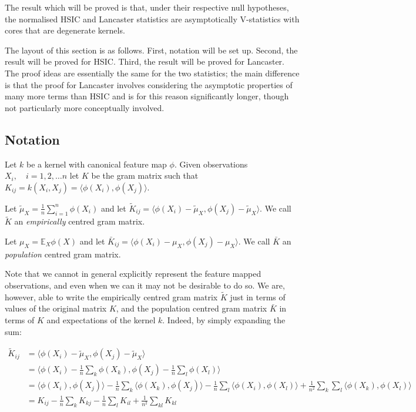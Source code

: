 \documentclass[12pt]{article}
\numberwithin{claim}{section}
\numberwithin{lemma}{section}
\numberwithin{theorem}{section}
\begin{document}
The result which will be proved is that, under their respective null hypotheses, the normalised HSIC and Lancaster statistics are asymptotically V-statistics with cores that are degenerate kernels. 

The layout of this section is as follows. First, notation will be set up. Second, the result will be proved for HSIC. Third, the result will be proved for Lancaster. The proof ideas are essentially the same for the two statistics; the main difference is that the proof for Lancaster involves considering the asymptotic properties of many more terms than HSIC and is for this reason significantly longer, though not particularly more conceptually involved.

\subsection{Notation}

Let $k$ be a kernel with canonical feature map $\phi$. Given observations $X_i, \quad i=1,2,\ldots n$ let $K$ be the gram matrix such that $K_{ij} = k(X_i,X_j) =  \langle \phi(X_i),\phi(X_j) \rangle$.

Let $\tilde{\mu}_X = \frac{1}{n}\sum_{i=1}^{n} \phi(X_i)$ and let $\tilde{K}_{ij} = \langle \phi(X_i) - \tilde{\mu}_X, \phi(X_j) - \tilde{\mu}_X \rangle$. We call $\tilde{K}$ an \emph{empirically} centred gram matrix.

Let $\mu_X = \mathbb{E}_X\phi(X)$ and let $\bar{K}_{ij} = \langle \phi(X_i) - \mu_X, \phi(X_j) - \mu_X \rangle$. We call $\bar{K}$ an \emph{population} centred gram matrix.

Note that we cannot in general explicitly represent the feature mapped observations, and even when we can it may not be desirable to do so. We are, however, able to write the empirically centred gram matrix $\tilde{K}$ just in terms of values of the original matrix $K$, and the population centred gram matrix $\bar{K}$ in terms of $K$ and expectations of the kernel $k$. Indeed, by simply expanding the sum:

\begin{align*}
\tilde{K}_{ij}  & = \langle \phi(X_i) - \tilde{\mu}_X, \phi(X_j) - \tilde{\mu}_X \rangle \\
& =  \langle \phi(X_i) - \frac{1}{n} \sum_k\phi(X_k), \phi(X_j) - \frac{1}{n} \sum_l \phi(X_l) \rangle \\
& =  \langle \phi(X_i), \phi(X_j) \rangle  - \frac{1}{n} \sum_k \langle \phi(X_k), \phi(X_j) \rangle - \frac{1}{n} \sum_l \langle \phi(X_i) ,  \phi(X_l) \rangle + \frac{1}{n^2}  \sum_k \sum_l \langle \phi(X_k),  \phi(X_l) \rangle \\
& = K_{ij} - \frac{1}{n} \sum_k K_{kj} -\frac{1}{n}  \sum_l K_{il} + \frac{1}{n^2} \sum_{kl} K_{kl} \\
\end{align*}
\end{document}
